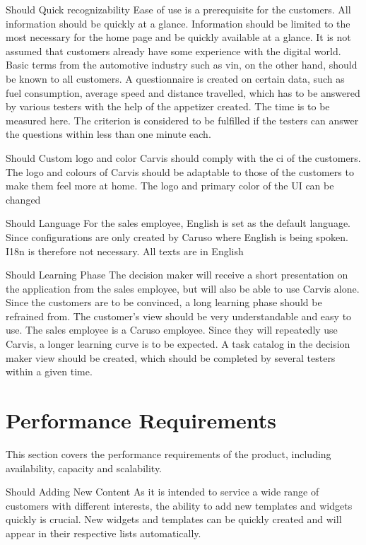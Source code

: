 {Should}
{Quick recognizability}
{Ease of use is a prerequisite for the customers. All information should be quickly at a glance. Information should be limited to the most necessary for the home page and be quickly available at a glance. It is not assumed that customers already have some experience with the digital world. Basic terms from the automotive industry such as \gls{vin}, on the other hand, should be known to all customers.}
{A questionnaire is created on certain data, such as fuel consumption, average speed and distance travelled, which has to be answered by various testers with the help of the appetizer created. The time is to be measured here. The criterion is considered to be fulfilled if the testers can answer the questions within less than one minute each.}

{Should}
{Custom logo and color}
{Carvis should comply with the \gls{ci} of the customers. The logo and colours of Carvis should be adaptable to those of the customers to make them feel more at home.}
{The logo and primary color of the UI can be changed}

{Should}
{Language}
{For the sales employee, English is set as the default language. Since configurations are only created by Caruso where English is being spoken. I18n is therefore not necessary.}
{All texts are in English}

{Should}
{Learning Phase}
{The decision maker will receive a short presentation on the application from the sales employee, but will also be able to use Carvis alone. Since the customers are to be convinced, a long learning phase should be refrained from. The customer's view should be very understandable and easy to use. The sales employee is a Caruso employee. Since they will repeatedly use Carvis, a longer learning curve is to be expected. }
{A task catalog in the decision maker view should be created, which should be completed by several testers within a given time.}


\section{Performance Requirements}
This section covers the performance requirements of the product, including availability, capacity and scalability.

{Should}
{Adding New Content}
{As it is intended to service a wide range of customers with different interests, the ability to add new templates and widgets quickly is crucial.}
{New widgets and templates can be quickly created and will appear in their respective lists automatically.}

